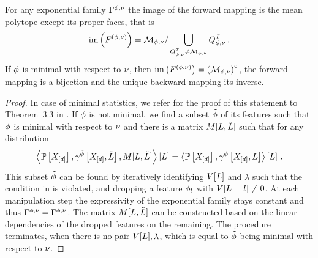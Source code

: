 \begin{theorem}
    \label{the:meanPolytopeInterior}
    For any exponential family $\Gamma^{\phi,\nu}$ the image of the forward mapping is the mean polytope except its proper faces, that is
    \begin{align*}
        \mathrm{im}\left(F^{(\phi,\nu)}\right) = \mathcal{M}_{\phi,\nu} / \bigcup_{Q^{\mathcal{I}}_{\phi,\nu}\neq\mathcal{M}_{\phi,\nu}} Q^{\mathcal{I}}_{\phi,\nu} \, .
    \end{align*}
    If $\phi$ is minimal with respect to $\nu$, then $\mathrm{im}\left(F^{(\phi,\nu)}\right)={\left(\mathcal{M}_{\phi,\nu}\right)}^{\circ}$, the forward mapping is a bijection and the unique backward mapping its inverse.
\end{theorem}
\begin{proof}
    In case of minimal statistics, we refer for the proof of this statement to Theorem~3.3 in \cite{wainwright_graphical_2008}.
    If $\phi$ is not minimal, we find a subset $\tilde{\phi}$ of its features such that $\tilde{\phi}$ is minimal with respect to $\nu$ and there is a matrix $M[L,\tilde{L}]$ such that for any distribution
    \begin{align*}
        \left\langle \mathbb{P}\left[X_{[d]}\right],\gamma^{\tilde{\phi}}\left[X_{[d]},\tilde{L}\right],M[L,\tilde{L}]\right\rangle \left[ L \right]
        = \left\langle \mathbb{P}\left[X_{[d]}\right],\gamma^{\phi}\left[X_{[d]},L\right]\right\rangle \left[ L \right] \, .
    \end{align*}
    This subset $\tilde{\phi}$ can be found by iteratively identifying $V[L]$ and $\lambda$ such that the condition in  is violated, and dropping a feature $\phi_{l}$ with $V[L_{}=l_{}]\neq0$.
    At each manipulation step the expressivity of the exponential family stays constant and thus $\Gamma^{\tilde{\phi},\nu}=\Gamma^{\phi,\nu}$.
    The matrix $M[L,\tilde{L}]$ can be constructed based on the linear dependencies of the dropped features on the remaining.
    The procedure terminates, when there is no pair $V[L],\lambda$, which is equal to $\tilde{\phi}$ being minimal with respect to $\nu$.

\end{proof}
